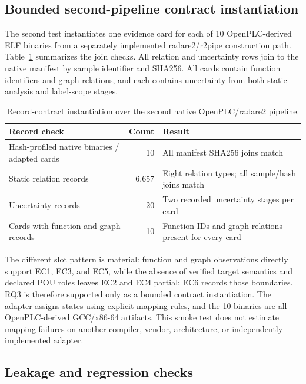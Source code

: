\documentclass[manuscript,screen,review]{acmart}
\begin{document}
\subsection{Bounded second-pipeline contract instantiation}

The second test instantiates one evidence card for each of 10 OpenPLC-derived ELF binaries from a separately implemented radare2/r2pipe construction path. Table~\ref{tab:cross_pipeline} summarizes the join checks. All relation and uncertainty rows join to the native manifest by sample identifier and SHA256. All cards contain function identifiers and graph relations, and each contains uncertainty from both static-analysis and label-scope stages.

\begin{table}[t]
\centering
\small
\caption{Record-contract instantiation over the second native OpenPLC/radare2 pipeline.}
\label{tab:cross_pipeline}
\begin{tabularx}{\textwidth}{>{\raggedright\arraybackslash}Xr>{\raggedright\arraybackslash}X}
\toprule
Record check & Count & Result \\
\midrule
Hash-profiled native binaries / adapted cards & 10 & All manifest SHA256 joins match \\
Static relation records & 6,657 & Eight relation types; all sample/hash joins match \\
Uncertainty records & 20 & Two recorded uncertainty stages per card \\
Cards with function and graph records & 10 & Function IDs and graph relations present for every card \\
\bottomrule
\end{tabularx}
\end{table}

The different slot pattern is material: function and graph observations directly support EC1, EC3, and EC5, while the absence of verified target semantics and declared POU roles leaves EC2 and EC4 partial; EC6 records those boundaries. RQ3 is therefore supported only as a bounded contract instantiation. The adapter assigns states using explicit mapping rules, and the 10 binaries are all OpenPLC-derived GCC/x86-64 artifacts. This smoke test does not estimate mapping failures on another compiler, vendor, architecture, or independently implemented adapter.

\subsection{Leakage and regression checks}
\end{document}

